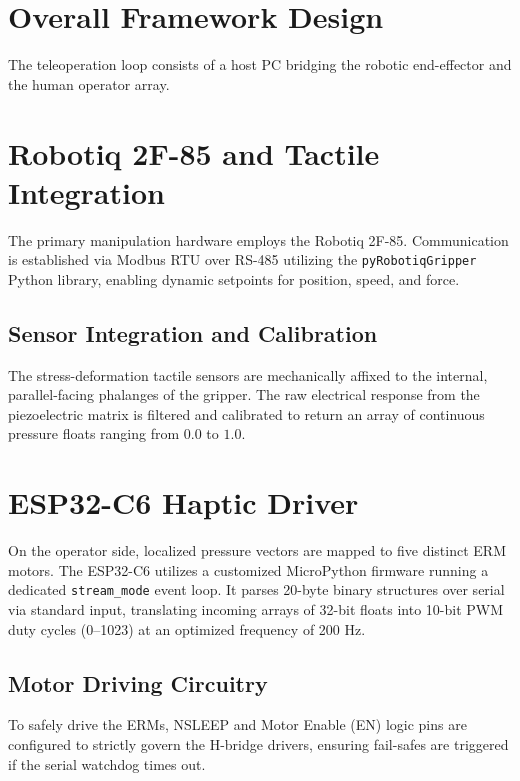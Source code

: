 \documentclass[12pt, a4paper]{report}
\begin{document}
\section{Overall Framework Design}
The teleoperation loop consists of a host PC bridging the robotic end-effector and the human operator array.

\section{Robotiq 2F-85 and Tactile Integration}
The primary manipulation hardware employs the Robotiq 2F-85. Communication is established via Modbus RTU over RS-485 utilizing the \texttt{pyRobotiqGripper} Python library, enabling dynamic setpoints for position, speed, and force.

\subsection{Sensor Integration and Calibration}
The stress-deformation tactile sensors are mechanically affixed to the internal, parallel-facing phalanges of the gripper. The raw electrical response from the piezoelectric matrix is filtered and calibrated to return an array of continuous pressure floats ranging from $0.0$ to $1.0$.

\section{ESP32-C6 Haptic Driver}
On the operator side, localized pressure vectors are mapped to five distinct ERM motors.
The ESP32-C6 utilizes a customized MicroPython firmware running a dedicated \texttt{stream\_mode} event loop. It parses 20-byte binary structures over serial via standard input, translating incoming arrays of 32-bit floats into 10-bit PWM duty cycles (0–1023) at an optimized frequency of 200 Hz.

\subsection{Motor Driving Circuitry}
To safely drive the ERMs, NSLEEP and Motor Enable (EN) logic pins are configured to strictly govern the H-bridge drivers, ensuring fail-safes are triggered if the serial watchdog times out.
\end{document}
